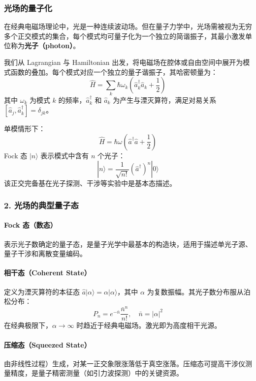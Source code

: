 \documentclass[hyperref, fntef, fancyhdr,zihao = -4,UTF8]{ctexart}
\begin{document}
\subsubsection{光场的量子化}

在经典电磁场理论中，光是一种连续波动场。但在量子力学中，光场需被视为无穷多个正交模式的集合，每个模式均可量子化为一个独立的简谐振子，其最小激发单位称为\textbf{光子（photon）}。

我们从 Lagrangian 与 Hamiltonian 出发，将电磁场在腔体或自由空间中展开为模式函数的叠加。每个模式对应一个独立的量子谐振子，其哈密顿量为：
\[
\hat{H} = \sum_k \hbar \omega_k \left( \hat{a}_k^\dagger \hat{a}_k + \frac{1}{2} \right)
\]
其中 $\omega_k$ 为模式 $k$ 的频率，$\hat{a}_k^\dagger$ 和 $\hat{a}_k$ 为产生与湮灭算符，满足对易关系 $[\hat{a}_j, \hat{a}_k^\dagger] = \delta_{jk}$。\cite{scully1997quantum}

单模情形下：
\[
\hat{H} = \hbar \omega \left( \hat{a}^\dagger \hat{a} + \frac{1}{2} \right)
\]
Fock 态 $|n\rangle$ 表示模式中含有 $n$ 个光子：
\[
|n\rangle = \frac{1}{\sqrt{n!}} (\hat{a}^\dagger)^n |0\rangle
\]
该正交完备基在光子探测、干涉等实验中是基本态描述。

\subsubsection{2. 光场的典型量子态}

\paragraph{Fock 态（数态）}
表示光子数确定的量子态，是量子光学中最基本的构造块，适用于描述单光子源、量子干涉和离散变量编码。

\paragraph{相干态（Coherent State）}
定义为湮灭算符的本征态 $\hat{a} |\alpha\rangle = \alpha |\alpha\rangle$，其中 $\alpha$ 为复数振幅。其光子数分布服从泊松分布：
\[
P_n = e^{-\bar{n}} \frac{\bar{n}^n}{n!}, \quad \bar{n} = |\alpha|^2
\]
在经典极限下，$\alpha \to \infty$ 时趋近于经典电磁场。激光即为高度相干光源。

\paragraph{压缩态（Squeezed State）}
由非线性过程）生成，对某一正交象限涨落低于真空涨落。压缩态可提高干涉仪测量精度，是量子精密测量（如引力波探测）中的关键资源。
\end{document}
